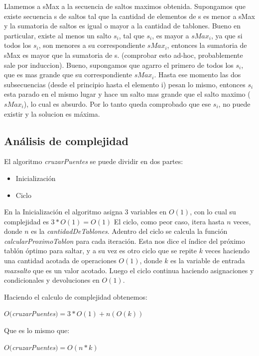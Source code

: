 Llamemos a sMax a la secuencia de saltos maximos obtenida.
Supongamos que existe secuencia s de saltos tal que la cantidad de elementos de s es menor a sMax y la sumatoria de saltos es igual o mayor a la cantidad de tablones.
Bueno en particular, existe al menos un salto $s_{i}$, tal que $s_{i}$, es mayor a $sMax_{i}$,  ya que si todos los $s_{i}$, son menores a su correspondiente $sMax_{i}$,
entonces la sumatoria de sMax es mayor que la sumatoria de s. (comprobar esto ad-hoc, probablemente sale por induccion).
Bueno, supongamos que agarro el primero de todos los $s_{i}$, que es mas grande que su correspondiente $sMax_{i}$.
Hasta ese momento las dos subsecuencias (desde el principio hasta el elemento i) pesan lo mismo, entonces $s_{i}$ esta parado en el mismo lugar y hace un salto mas grande que el salto maximo ($sMax_{i}$), lo cual es absurdo.
Por lo tanto queda comprobado que ese $s_{i}$, no puede existir y la solucion es m\'axima.

\subsection{An\'alisis de complejidad}
El algoritmo \textit{cruzarPuentes} se puede dividir en dos partes:
\begin{itemize}
\item Inicialización
\item Ciclo
\end{itemize}

En la Inicialización el algoritmo asigna 3 variables en $O(1)$, con lo cual su complejidad es $3*O(1) = O(1)$
El ciclo, como peor caso, itera hasta $n$ veces, donde $n$ es la \textit{cantidadDeTablones}. Adentro del ciclo se calcula la función \textit{calcularProximoTablon} para cada iteración. Esta nos dice el índice del próximo tablón óptimo para saltar, y a su vez es otro ciclo que se repite $k$ veces haciendo una cantidad acotada de operaciones $O(1)$, donde $k$ es la variable de entrada \textit{maxsalto} que es un valor acotado.
Luego el ciclo continua haciendo asignaciones y condicionales y devoluciones en $O(1)$.

Haciendo el calculo de complejidad obtenemos:

$O($\textit{cruzarPuentes}$) = 3*O(1) + n(O(k))$

Que es lo mismo que:

$O($\textit{cruzarPuentes}$) = O(n*k)$

